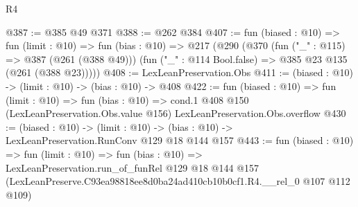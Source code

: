 \begin{lexlean}{R4}
\begin{coremodule}
@387 := @385 @49 @371
@388 := @262 @384
@407 := fun (biased : @10) =>
  fun (limit : @10) =>
  fun (bias : @10) =>
  @217
    (@290
      (@370
        (fun ("_" : @115) => @387 (@261 (@388 @49)))
        (fun ("_" : @114 Bool.false) => @385 @23 @135 (@261 (@388 @23)))))
@408 := LexLeanPreservation.Obs
@411 := (biased : @10) -> (limit : @10) -> (bias : @10) -> @408
@422 := fun (biased : @10) =>
  fun (limit : @10) =>
  fun (bias : @10) =>
  cond.{1} @408 @150 (LexLeanPreservation.Obs.value @156) LexLeanPreservation.Obs.overflow
@430 := (biased : @10) ->
  (limit : @10) -> (bias : @10) -> LexLeanPreservation.RunConv @129 @18 @144 @157
@443 := fun (biased : @10) =>
  fun (limit : @10) =>
  fun (bias : @10) =>
  LexLeanPreservation.run_of_funRel
    @129
    @18
    @144
    @157
    (LexLeanPreserve.C93ea98818ee8d0ba24ad410cb10b0cf1.R4.__rel_0 @107 @112 @109)
\end{coremodule}
\end{lexlean}

